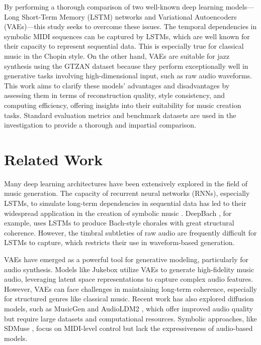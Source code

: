 \documentclass[conference]{IEEEtran}
\begin{document}
By performing a thorough comparison of two well-known deep learning models—Long Short-Term Memory (LSTM) networks and Variational Autoencoders (VAEs)—this study seeks to overcome these issues.  The temporal dependencies in symbolic MIDI sequences can be captured by LSTMs, which are well known for their capacity to represent sequential data. This is especially true for classical music in the Chopin style.  On the other hand, VAEs are suitable for jazz synthesis using the GTZAN dataset because they perform exceptionally well in generative tasks involving high-dimensional input, such as raw audio waveforms.  This work aims to clarify these models' advantages and disadvantages by assessing them in terms of reconstruction quality, style consistency, and computing efficiency, offering insights into their suitability for music creation tasks. Standard evaluation metrics and benchmark datasets are used in the investigation to provide a thorough and impartial comparison.

\section{Related Work}
Many deep learning architectures have been extensively explored in the field of music generation.  The capacity of recurrent neural networks (RNNs), especially LSTMs, to simulate long-term dependencies in sequential data has led to their widespread application in the creation of symbolic music \cite{1030094}.  DeepBach \cite{pmlr-v70-hadjeres17a}, for example, uses LSTMs to produce Bach-style chorales with great structural coherence.  However, the timbral subtleties of raw audio are frequently difficult for LSTMs to capture, which restricts their use in waveform-based generation.

VAEs have emerged as a powerful tool for generative modeling, particularly for audio synthesis. Models like Jukebox \cite{dhariwal2020jukebox} utilize VAEs to generate high-fidelity music audio, leveraging latent space representations to capture complex audio features. However, VAEs can face challenges in maintaining long-term coherence, especially for structured genres like classical music. Recent work has also explored diffusion models, such as MusicGen \cite{copet2024simplecontrollablemusicgeneration} and AudioLDM2 \cite{liu2024audioldm2learningholistic}, which offer improved audio quality but require large datasets and computational resources. Symbolic approaches, like SDMuse \cite{zhang2022sdmusestochasticdifferentialmusic}, focus on MIDI-level control but lack the expressiveness of audio-based models.
\end{document}
